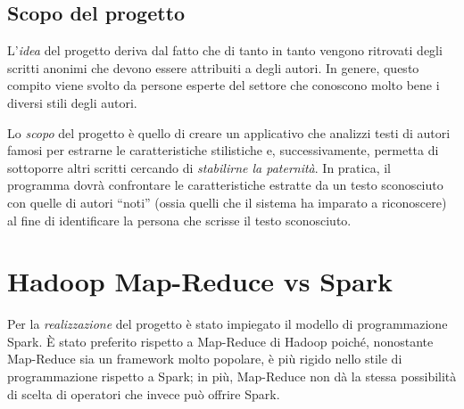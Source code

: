 \documentclass[titlepage]{article}
\begin{document}
\subsection{Scopo del progetto}
L'\textit{idea} del progetto deriva dal fatto che di tanto in tanto vengono ritrovati degli scritti anonimi che devono essere attribuiti a degli autori. In genere, questo compito viene svolto da persone esperte del settore che conoscono molto bene i diversi stili degli autori.

Lo \textit{scopo} del progetto è quello di creare un applicativo che analizzi testi di autori famosi per estrarne le caratteristiche stilistiche e, successivamente, permetta di sottoporre altri scritti cercando di \emph{stabilirne la paternità}. In pratica, il programma dovrà confrontare le caratteristiche estratte da un testo sconosciuto con quelle di autori ``noti'' (ossia quelli che il sistema ha imparato a riconoscere) al fine di identificare la persona che scrisse il testo sconosciuto.


\newpage
\section{Hadoop Map-Reduce vs Spark}
\label{sec:2}
Per la \textit{realizzazione} del progetto è stato impiegato il modello di programmazione Spark. \`{E} stato preferito rispetto a Map-Reduce di Hadoop poiché, nonostante Map-Reduce sia un framework molto popolare, è più rigido nello stile di programmazione rispetto a Spark; in più, Map-Reduce non dà la stessa possibilità di scelta di operatori che invece può offrire Spark.
\end{document}
